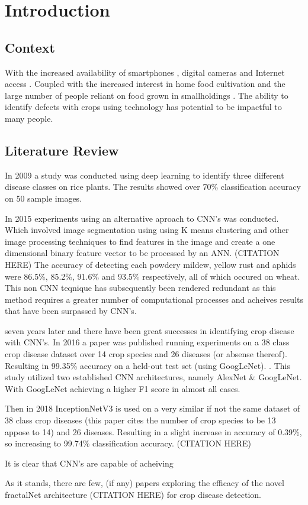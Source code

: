 \chapter{Introduction}
\label{introduction}

\section{Context}
  With the increased availability of smartphones \cite{Statista:2021}, digital cameras \cite{ImarcGroup} and Internet access \cite{Wikipedia} \cite{Globaltt}. Coupled with the increased interest in home food cultivation \cite{Google} and the large number of people reliant on food grown in smallholdings \cite{JLIFADSmallHolders}. The ability to identify defects with crops using technology has potential to be impactful to many people.
\section{Literature Review}
  \par
  In 2009 a study was conducted using deep learning to identify three different disease classes on rice plants. The results showed over 70\% classification accuracy on 50 sample images. \cite{Anthonys2009}
  \par
  In 2015 experiments using an alternative aproach to CNN's was conducted. Which involved image segmentation
  using using K means clustering and other image processing techniques to find features in the image and create a one dimensional binary feature vector to be processed by an ANN. (CITATION HERE) The accuracy of detecting each powdery mildew, yellow rust and aphids were 86.5\%, 85.2\%, 91.6\% and 93.5\% respectively, all of which occured on wheat.
  This non CNN teqnique has subsequently been rendered redundant as this method requires a greater number of
  computational processes and acheives results that have been surpassed by CNN's.
  \par
  seven years later and there have been great successes in identifying crop disease with CNN's. In 2016 a paper was published running experiments on a 38 class crop disease
  dataset over 14 crop species and 26 diseases (or absense thereof). Resulting in 99.35\% accuracy on a held-out test set (using GoogLeNet). \cite{Mohanty2016}. This study utilized two established CNN architectures, namely AlexNet \cite{Krizhevsky} & GoogLeNet. \cite{Szegedy_2015_CVPR} With GoogLeNet achieving a higher F1 score in almost all cases.
  \par
  Then in 2018 InceptionNetV3 is used on a very similar if not the same dataset of 38 class crop diseases (this paper cites the number of crop species to be 13 appose to 14) and 26 diseases. Resulting in a slight increase in accuracy of 0.39\%, so increasing to 99.74\% classification accuracy. (CITATION HERE)%
  \par
  It is clear that CNN's are capable of acheiving
  \par
  As it stands, there are few, (if any) papers exploring the efficacy of the novel fractalNet architecture (CITATION HERE) for crop disease detection.
